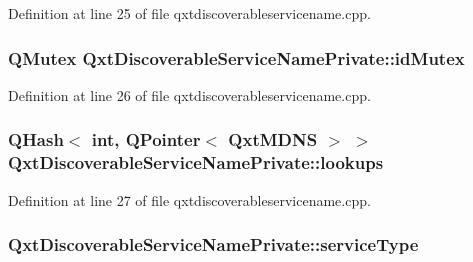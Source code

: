 Definition at line 25 of file qxtdiscoverableservicename.\-cpp.

\hypertarget{class_qxt_discoverable_service_name_private_a1e30b0edc58d9aabfafae63ff75e239d}{
\subsubsection[{id\-Mutex}]{\setlength{\rightskip}{0pt plus 5cm}Q\-Mutex Qxt\-Discoverable\-Service\-Name\-Private\-::id\-Mutex\hspace{0.3cm}{\ttfamily [static]}}}\label{class_qxt_discoverable_service_name_private_a1e30b0edc58d9aabfafae63ff75e239d}


Definition at line 26 of file qxtdiscoverableservicename.\-cpp.

\hypertarget{class_qxt_discoverable_service_name_private_aac6eb1586eaca5c739f198ae80f0e5e9}{
\subsubsection[{lookups}]{\setlength{\rightskip}{0pt plus 5cm}Q\-Hash$<$ {\bf int}, Q\-Pointer$<$ {\bf Qxt\-M\-D\-N\-S} $>$ $>$ Qxt\-Discoverable\-Service\-Name\-Private\-::lookups\hspace{0.3cm}{\ttfamily [static]}}}\label{class_qxt_discoverable_service_name_private_aac6eb1586eaca5c739f198ae80f0e5e9}


Definition at line 27 of file qxtdiscoverableservicename.\-cpp.

\hypertarget{class_qxt_discoverable_service_name_private_a0c73907f9b0e2f19080ddc550235417b}{
\subsubsection[{service\-Type}]{ Qxt\-Discoverable\-Service\-Name\-Private\-::service\-Type}}\label{class_qxt_discoverable_service_name_private_a0c73907f9b0e2f19080ddc550235417b}


